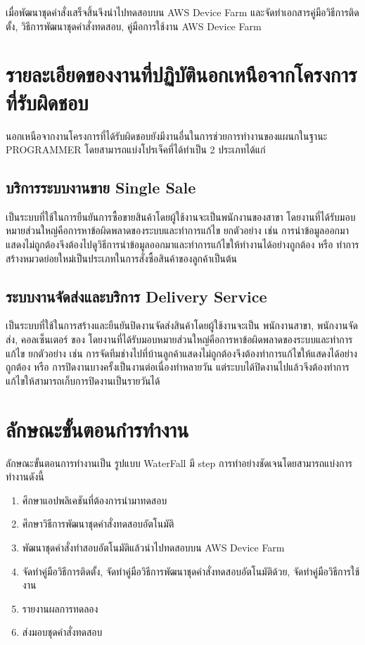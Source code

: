         เมื่อพัฒนาชุดคำสั่งเสร็จสิ้นจึงนำไปทดสอบบน AWS Device Farm และจัดทำเอกสารคู่มือวิธีการติดตั้ง, วิธีการพัฒนาชุดคำสั่งทดสอบ, คู่มือการใช้งาน AWS Device Farm

\newpage
\section{รายละเอียดของงานที่ปฏิบัตินอกเหนือจากโครงการที่รับผิดชอบ}
    นอกเหนือจากงานโครงการที่ได้รับผิดชอบยังมีงานอื่นในการช่วยการทำงานของแผนกในฐานะ PROGRAMMER โดยสามารถแบ่งโปรเจ็คที่ได้ทำเป็น 2 ประเภทได้แก่
    
    \subsection{บริการระบบงานขาย Single Sale}
        เป็นระบบที่ใช้ในการยืนยันการซื้อขายสินค้าโดยผู้ใช้งานจะเป็นพนักงานของสาขา {\Company} โดยงานที่ได้รับมอบหมายส่วนใหญ่คือการหาข้อผิดพลาดของระบบและทำการแก้ไข
        ยกตัวอย่าง เช่น การนำข้อมูลออกมาแสดงไม่ถูกต้องจึงต้องไปดูวิธีการนำข้อมูลออกมาและทำการแก้ไขให้ทำงานได้อย่างถูกต้อง หรือ ทำการสร้างหมวดย่อยใหม่เป็นประเภทในการสั่งซื้อสินค้าของลูกค้าเป็นต้น
    
    \subsection{ระบบงานจัดส่งและบริการ Delivery Service}
        เป็นระบบที่ใช้ในการสร้างและยืนยันปิดงานจัดส่งสินค้าโดยผู้ใช้งานจะเป็น พนักงานสาขา, พนักงานจัดส่ง, คอลเซ็นเตอร์ ของ {\Company} โดยงานที่ได้รับมอบหมายส่วนใหญ่คือการหาข้อผิดพลาดของระบบและทำการแก้ไข
        ยกตัวอย่าง เช่น การจัดทีมช่างไปที่บ้านลูกค้าแสดงไม่ถูกต้องจึงต้องทำการแก้ไขให้แสดงได้อย่างถูกต้อง หรือ การปิดงานบางครั้งเป็นงานต่อเนื่องทำหลายวัน
        แต่ระบบได้ปิดงานไปแล้วจึงต้องทำการแก้ไขให้สามารถเก็บการปิดงานเป็นรายวันได้

\section{ลักษณะขั้นตอนกํารทำงาน}
        ลักษณะขั้นตอนการทำงานเป็น รูปแบบ WaterFall มี step การทำอย่างชัดเจนโดยสามารถแบ่งการทำงานดังนี้
        \begin{enumerate}
            \item ศึกษาแอปพลิเคชันที่ต้องการนำมาทดสอบ
            \item ศึกษาวิธีการพัฒนาชุดคำสั่งทดสอบอัตโนมัติ
            \item พัฒนาชุดคำสั่งทำสอบอัตโนมัติแล้วนำไปทดสอบบน AWS Device Farm
            \item จัดทำคู่มือวิธีการติดตั้ง, จัดทำคู่มือวิธีการพัฒนาชุดคำสั่งทดสอบอัตโนมัติด้วย, จัดทำคู่มือวิธีการใช้งาน
            \item รายงานผลการทดลอง
            \item ส่งมอบชุดคำสั่งทดสอบ
        \end{enumerate}


